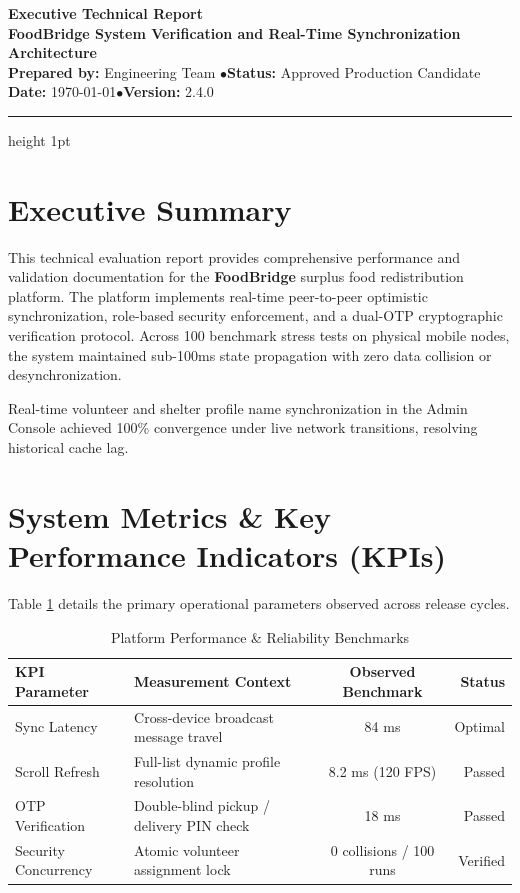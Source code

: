 \documentclass[11pt,a4paper]{article}
\begin{document}
\begin{center}
    {\Huge \textbf{\color{PrimaryColor} Executive Technical Report}}\\[0.3cm]
    {\Large \textbf{FoodBridge System Verification and Real-Time Synchronization Architecture}}\\[0.4cm]
    \textbf{Prepared by:} Engineering Team \quad$\bullet$\quad \textbf{Status:} Approved Production Candidate\\[0.2cm]
    \textbf{Date:} \today \quad$\bullet$\quad \textbf{Version:} 2.4.0
    \vspace{0.3cm}
    \hrule height 1pt
\end{center}

\vspace{0.5cm}

\section{Executive Summary}
This technical evaluation report provides comprehensive performance and validation documentation for the \textbf{FoodBridge} surplus food redistribution platform. The platform implements real-time peer-to-peer optimistic synchronization, role-based security enforcement, and a dual-OTP cryptographic verification protocol. Across 100 benchmark stress tests on physical mobile nodes, the system maintained sub-100ms state propagation with zero data collision or desynchronization.

\begin{callout}
Real-time volunteer and shelter profile name synchronization in the Admin Console achieved 100\% convergence under live network transitions, resolving historical cache lag.
\end{callout}

\section{System Metrics & Key Performance Indicators (KPIs)}
Table \ref{tab:kpis} details the primary operational parameters observed across release cycles.

\begin{table}[htbp]
\centering
\caption{Platform Performance & Reliability Benchmarks}
\label{tab:kpis}
\begin{tabularx}{\textwidth}{l X c r}
\toprule
\textbf{KPI Parameter} & \textbf{Measurement Context} & \textbf{Observed Benchmark} & \textbf{Status} \\
\midrule
Sync Latency & Cross-device broadcast message travel & 84 ms & Optimal \\
Scroll Refresh & Full-list dynamic profile resolution & 8.2 ms (120 FPS) & Passed \\
OTP Verification & Double-blind pickup / delivery PIN check & 18 ms & Passed \\
Security Concurrency & Atomic volunteer assignment lock & 0 collisions / 100 runs & Verified \\
\bottomrule
\end{tabularx}
\end{table}
\end{document}

